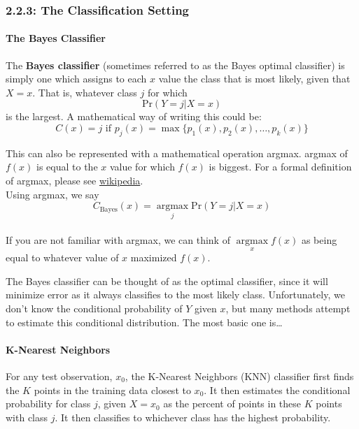 \subsubsection*{2.2.3: The Classification Setting}\label{the-classification-setting}

\paragraph{The Bayes Classifier}


The \textbf{Bayes classifier} (sometimes referred to as the Bayes optimal classifier) is simply one which assigns to each \(x\) value the class that is most likely, given that \(X=x\). That is, whatever class \(j\) for which 
\begin{equation*}
\text{Pr}(Y=j | X=x)
\end{equation*}
is the largest. A mathematical way of writing this
could be: 
\begin{equation*} 
C(x) = j \text{ if } p_j(x) = \max\{p_1(x), p_2(x), \ldots, p_k(x)\}
\end{equation*}

\begin{aside}
    This can also be represented with a mathematical operation    argmax.  argmax of \(f(x)\) is equal to the \(x\) value
    for which \(f(x)\) is biggest. For a formal definition of argmax,
    please see \href{https://en.wikipedia.org/wiki/Arg_max}{wikipedia}.\\
    Using argmax, we say
    \begin{equation*}
        C_{\text{Bayes}} (x) = \underset{j}{\operatorname{argmax}} \text{Pr}(Y=j | X=x)
    \end{equation*}\\
    If you are not familiar with argmax, we can think of \(\underset{x}{\operatorname{argmax}} f(x)\) as being equal to whatever value
    of \(x\) maximized \(f(x)\).
\end{aside}

The Bayes classifier can be thought of as the optimal classifier, since it will minimize error as it always 
classifies to the most likely class. Unfortunately, we don't know the conditional probability of \(Y\) given
\(x\), but many methods attempt to estimate this conditional distribution. The most basic one is\ldots{}

\paragraph{K-Nearest Neighbors}
For any test observation, \(x_0\), the K-Nearest Neighbors (KNN)
classifier first finds the \(K\) points in the training data closest to
\(x_0\). It then estimates the conditional probability for class \(j\),
given \(X=x_0\) as the percent of points in these \(K\) points with
class \(j\). It then classifies to whichever class has the highest
probability.

